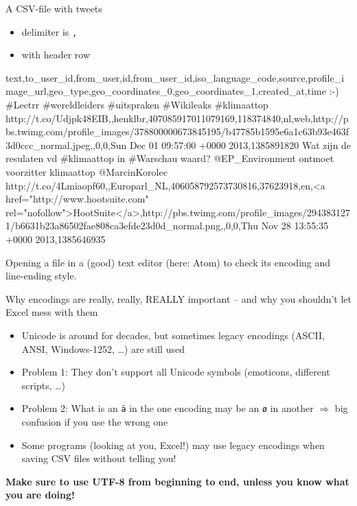 \begin{frame}[fragile]{A CSV-file with tweets}
	\begin{itemize}
		\item delimiter is \texttt{,}
		\item with  header row
	\end{itemize}
	\begin{lstlistingoutput}
text,to_user_id,from_user,id,from_user_id,iso_language_code,source,profile_image_url,geo_type,geo_coordinates_0,geo_coordinates_1,created_at,time
:-) #Lectrr #wereldleiders #uitspraken #Wikileaks #klimaattop http://t.co/Udjpk48EIB,,henklbr,407085917011079169,118374840,nl,web,http://pbs.twimg.com/profile_images/378800000673845195/b47785b1595e6a1c63b93e463f3d0ccc_normal.jpeg,,0,0,Sun Dec 01 09:57:00 +0000 2013,1385891820
Wat zijn de resulaten vd #klimaattop in #Warschau waard? @EP_Environment ontmoet voorzitter klimaattop @MarcinKorolec http://t.co/4Lmiaopf60,,Europarl_NL,406058792573730816,37623918,en,<a href="http://www.hootsuite.com" rel="nofollow">HootSuite</a>,http://pbs.twimg.com/profile_images/2943831271/b6631b23a86502fae808ca3efde23d0d_normal.png,,0,0,Thu Nov 28 13:55:35 +0000 2013,1385646935
\end{lstlistingoutput}
\end{frame}



\begin{frame}[plain]

Opening a file in a (good) text editor (here: Atom) to check its encoding and line-ending style.
\end{frame}


\begin{frame}{Why encodings are really, really, REALLY important -- and why you shouldn't let Excel mess with them}
\begin{itemize}
	\item Unicode is around for decades, but sometimes legacy encodings (ASCII, ANSI, Windows-1252, \ldots) are still used
	\item Problem 1: They don't support all Unicode symbols (emoticons, different scripts, \ldots)
	\item Problem 2: What is an \texttt{\"a} in the one encoding may be an \texttt{\o}  in another $\Rightarrow$ big confusion if you use the wrong one
	\item Some programs (looking at you, Excel!) may use legacy encodings when saving CSV files without telling you!
\end{itemize}
\textbf{Make sure to use UTF-8 from beginning to end, unless you know what you are doing!}

\end{frame}




